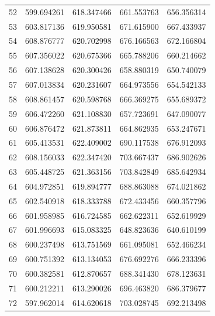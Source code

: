 \begin{table}
\begin{tabular}{rrrrr}
52 & 599.694261 & 618.347466 & 661.553763 & 656.356314 \\
53 & 603.817136 & 619.950581 & 671.615900 & 667.433937 \\
54 & 608.876777 & 620.702998 & 676.166563 & 672.166804 \\
55 & 607.356022 & 620.675366 & 665.788206 & 660.214662 \\
56 & 607.138628 & 620.300426 & 658.880319 & 650.740079 \\
57 & 607.013834 & 620.231607 & 664.973556 & 654.542133 \\
58 & 608.861457 & 620.598768 & 666.369275 & 655.689372 \\
59 & 606.472260 & 621.108830 & 657.723691 & 647.090077 \\
60 & 606.876472 & 621.873811 & 664.862935 & 653.247671 \\
61 & 605.413531 & 622.409002 & 690.117538 & 676.912093 \\
62 & 608.156033 & 622.347420 & 703.667437 & 686.902626 \\
63 & 605.448725 & 621.363156 & 703.842849 & 685.642934 \\
64 & 604.972851 & 619.894777 & 688.863088 & 674.021862 \\
65 & 602.540918 & 618.333788 & 672.433456 & 660.357796 \\
66 & 601.958985 & 616.724585 & 662.622311 & 652.619929 \\
67 & 601.996693 & 615.083325 & 648.823636 & 640.610199 \\
68 & 600.237498 & 613.751569 & 661.095081 & 652.466234 \\
69 & 600.751392 & 613.134053 & 676.692276 & 666.233396 \\
70 & 600.382581 & 612.870657 & 688.341430 & 678.123631 \\
71 & 600.212211 & 613.290026 & 696.463820 & 686.379677 \\
72 & 597.962014 & 614.620618 & 703.028745 & 692.213498 \\
\bottomrule
\end{tabular}
\end{table}
